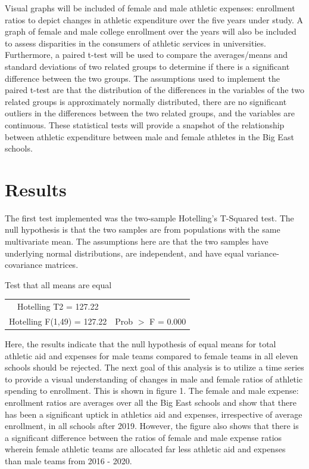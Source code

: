 \documentclass[11pt]{article}
\begin{document}
Visual graphs will be included of female and male athletic expenses: enrollment ratios to depict changes in athletic expenditure over the five years under study. A graph of female and male college enrollment over the years will also be included to assess disparities in the consumers of athletic services in universities. Furthermore, a paired t-test will be used to compare the averages/means and standard deviations of two related groups to determine if there is a significant difference between the two groups. The assumptions used to implement the paired t-test are that the distribution of the differences in the variables of the two related groups is approximately normally distributed, there are no significant outliers in the differences between the two related groups, and the variables are continuous. These statistical tests will provide a snapshot of the relationship between athletic expenditure between male and female athletes in the Big East schools.

\section{Results}
The first test implemented was the two-sample Hotelling's T-Squared test. The null hypothesis is that the two samples are from populations with the same multivariate mean. The assumptions here are that the two samples have underlying normal distributions, are independent, and have equal variance-covariance matrices. 

\begin{center}
Test that all means are equal
    \begin{tabular}{c|c}
    Hotelling T2 = 127.22 &  \\
    Hotelling F(1,49) = 127.22 & Prob $>$ F = 0.000
    \end{tabular}
\end{center}

Here, the results indicate that the null hypothesis of equal means for total athletic aid and expenses for male teams compared to female teams in all eleven schools should be rejected. The next goal of this analysis is to utilize a time series to provide a visual understanding of changes in male and female ratios of athletic spending to enrollment. This is shown in figure 1. The female and male expense: enrollment ratios are averages over all the Big East schools and show that there has been a significant uptick in athletics aid and expenses, irrespective of average enrollment, in all schools after 2019. However, the figure also shows that there is a significant difference between the ratios of female and male expense ratios wherein female athletic teams are allocated far less athletic aid and expenses than male teams from 2016 - 2020. 
\end{document}
